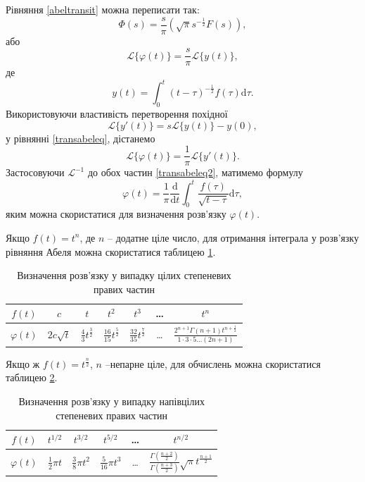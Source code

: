 \documentclass[14pt,twoside]{extreport}
\theoremstyle{mystyle}
\numberwithin{equation}{chapter}
\begin{document}
Рівняння \eqref{abeltransit} можна переписати так:
\begin{equation}
	\Phi(s)=\displaystyle \frac{s}{\pi}(\sqrt{\pi}s^{-\frac{1}{2}}F(s)),
\end{equation}
або
\begin{equation}\label{transabeleq}
	\displaystyle \mathcal{L}\{\varphi(t)\}=\frac{s}{\pi}\mathcal{L}\{y(t)\},
\end{equation}
де
\begin{equation}
	y(t)=\int_{0}^{t}(t-\tau)^{-\frac{1}{2}}f(\tau)\mathrm{d}\tau.
\end{equation}
Використовуючи властивість перетворення похідної
\begin{equation}
	\mathcal{L}\{y'(t)\}=s\mathcal{L}\{y(t)\}-y(0),
\end{equation}
у рівнянні \eqref{transabeleq}, дістанемо
\begin{equation}\label{transabeleq2}
\mathcal{L}\{\varphi(t)\}=\frac{1}{\pi}\mathcal{L}\{y'(t)\}.
\end{equation}
Застосовуючи $\mathcal{L}^{-1}$ до обох частин \eqref{transabeleq2}, матимемо формулу
\begin{equation}\label{abelsolution}
	\varphi(t)=\displaystyle \frac{1}{\pi}\frac{\mathrm{d}}{\mathrm{d}t}\int_{0}^{t}\frac{f(\tau)}{\sqrt{t-\tau}}\mathrm{d}\tau,
\end{equation}
яким можна скористатися для визначення розв'язку $\varphi(t)$.

Якщо $f(t)=t^{n}$, де $n$ -- додатне ціле число, для отримання інтеграла у розв'язку рівняння Абеля можна скористатися таблицею \ref{tableabe1}.
\begin{table}[ht]
	\caption{Визначення розв'язку у випадку цілих степеневих правих частин}\label{tableabe1}\centering
        \renewcommand{\arraystretch}{2}
\begin{tabular}{|c|c|c|c|c|c|c|}
	\hline
	$f(t)$ & $c$ & $t$ & $t^2$ & $t^3$ & \ldots & $t^n$ \\
	\hline
	$\varphi(t)$ & $2c\sqrt{t}$ & $\frac{4}{3}t^{\frac{3}{2}}$ & $\frac{16}{15}t^{\frac{5}{2}}$ & $\frac{32}{35}t^{\frac{7}{2}}$ & \ldots & $\frac{2^{n+1}\Gamma(n+1) t^{n+\frac{1}{2}}}{1 \cdot 3 \cdot 5 \ldots (2n+1)}$ \\
	\hline
\end{tabular}
\end{table}

Якщо ж $f(t)=t^{\frac{n}{2}}$, $n$ --непарне ціле, для обчислень можна скористатися таблицею \ref{tableabe2}.
\begin{table}[ht]
	\caption{Визначення розв'язку у випадку напівцілих степеневих правих частин}\label{tableabe2}\centering
        \renewcommand{\arraystretch}{2}
	\begin{tabular}{|c|c|c|c|c|c|}
		\hline
		$f(t)$ & $t^{1/2}$ & $t^{3/2}$ & $t^{5/2}$ & \ldots & $t^{n/2}$ \\
		\hline
		$\varphi(t)$ & $\frac{1}{2}\pi t$ & $\frac{3}{8}\pi t^2$ & $\frac{5}{16}\pi t^3$ & \ldots & $\frac{\Gamma(\frac{n+2}{2})}{\Gamma(\frac{n+3}{2})}\sqrt{\pi} t^{\frac{n+1}{2}}$ \\
		\hline
	\end{tabular}
\end{table}
\end{document}
